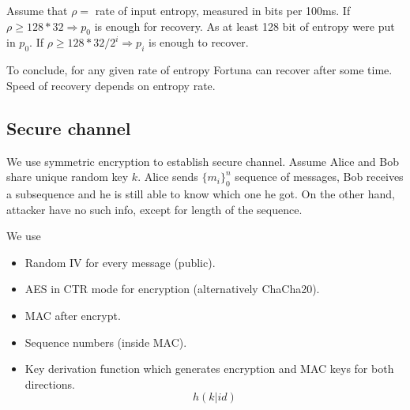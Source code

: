 Assume that $\rho = $ rate of input entropy, measured in bits per 100ms.
If $\rho \geq 128 * 32 \Rightarrow p_0$ is enough for recovery. As at least 128 bit of entropy were put in $p_0$.
If $ \rho \geq 128 * 32/2^i \Rightarrow p_i$ is enough to recover.

To conclude, for any given rate of entropy Fortuna can recover after some time. Speed of recovery depends on entropy rate.

\subsection{Secure channel}
We use symmetric encryption to establish secure channel. Assume Alice and Bob share unique random key $k$.
Alice sends $\{ m_i \}_0^n$ sequence of messages, Bob receives a subsequence and he is still able to know which one he got.
On the other hand, attacker have no such info, except for length of the sequence.

We use
\begin{itemize}
	\item Random IV for every message (public).
	\item AES in CTR mode for encryption (alternatively ChaCha20).
	\item MAC after encrypt.
	\item Sequence numbers (inside MAC).
	\item Key derivation function which generates encryption and MAC keys for both directions.
		\[ h(k | id) \]
\end{itemize}
